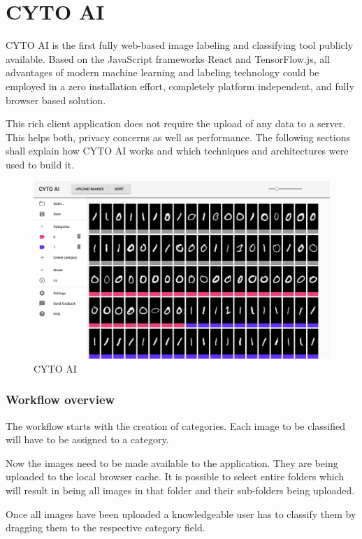 \chapter{CYTO AI}

CYTO AI is the first fully web-based image labeling and classifying tool publicly available. Based on the JavaScript frameworks React and TensorFlow.js,
all advantages of modern machine learning and labeling
technology could be employed in a zero installation effort,
completely platform independent, and fully browser based
solution.

This rich client application does not require the upload of
any data to a server. This helps both, privacy concerns as well as performance. The following sections shall explain how CYTO AI works and which techniques and architectures were used to build it.

\begin{figure}[H]
	\centering
	\includegraphics[width=0.8\linewidth]{bilder/cyto/cyto.png}
	\caption{CYTO AI}
	\label{fig:COMPONENT}
\end{figure}


\subsection{Workflow overview}

The workflow starts with the creation of categories. Each image to be classified will have to be assigned to a category.

Now the images need to be made available to the application.
They are being uploaded to the local browser cache.
It is possible to select entire folders which will result in being all images in that folder and their sub-folders being uploaded.

Once all images have been uploaded a knowledgeable user has
to classify them by dragging them to the respective category field.

